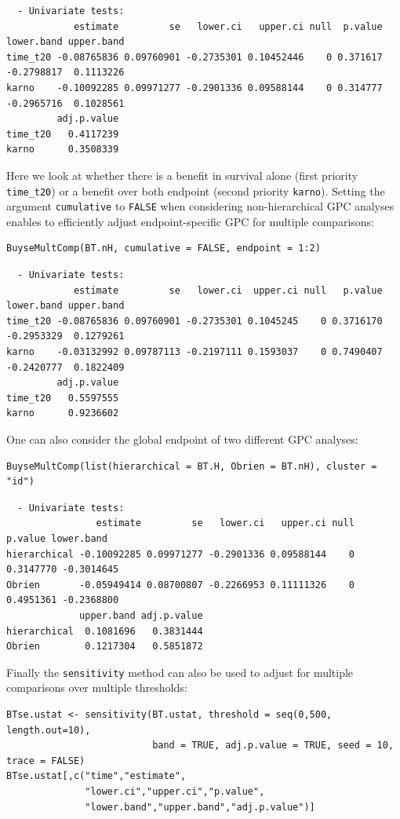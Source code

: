 \documentclass[12pt]{article}
\begin{document}
\begin{verbatim}
  - Univariate tests:
            estimate         se   lower.ci   upper.ci null  p.value lower.band upper.band
time_t20 -0.08765836 0.09760901 -0.2735301 0.10452446    0 0.371617 -0.2798817  0.1113226
karno    -0.10092285 0.09971277 -0.2901336 0.09588144    0 0.314777 -0.2965716  0.1028561
         adj.p.value
time_t20   0.4117239
karno      0.3508339
\end{verbatim}


Here we look at whether there is a benefit in survival alone (first
priority \texttt{time\_t20}) or a benefit over both endpoint (second priority
\texttt{karno}). Setting the argument \texttt{cumulative} to \texttt{FALSE} when
considering non-hierarchical GPC analyses enables to efficiently
adjust endpoint-specific GPC for multiple comparisons:
\lstset{language=r,label= ,caption= ,captionpos=b,numbers=none}
\begin{lstlisting}
BuyseMultComp(BT.nH, cumulative = FALSE, endpoint = 1:2)
\end{lstlisting}

\begin{verbatim}
  - Univariate tests:
            estimate         se   lower.ci  upper.ci null   p.value lower.band upper.band
time_t20 -0.08765836 0.09760901 -0.2735301 0.1045245    0 0.3716170 -0.2953329  0.1279261
karno    -0.03132992 0.09787113 -0.2197111 0.1593037    0 0.7490407 -0.2420777  0.1822409
         adj.p.value
time_t20   0.5597555
karno      0.9236602
\end{verbatim}


One can also consider the global endpoint of two different GPC analyses:
\lstset{language=r,label= ,caption= ,captionpos=b,numbers=none}
\begin{lstlisting}
BuyseMultComp(list(hierarchical = BT.H, Obrien = BT.nH), cluster = "id")
\end{lstlisting}

\begin{verbatim}
  - Univariate tests:
                estimate         se   lower.ci   upper.ci null   p.value lower.band
hierarchical -0.10092285 0.09971277 -0.2901336 0.09588144    0 0.3147770 -0.3014645
Obrien       -0.05949414 0.08700807 -0.2266953 0.11111326    0 0.4951361 -0.2368800
             upper.band adj.p.value
hierarchical  0.1081696   0.3831444
Obrien        0.1217304   0.5851872
\end{verbatim}


Finally the \texttt{sensitivity} method can also be used to adjust for
multiple comparisons over multiple thresholds:
\lstset{language=r,label= ,caption= ,captionpos=b,numbers=none}
\begin{lstlisting}
BTse.ustat <- sensitivity(BT.ustat, threshold = seq(0,500, length.out=10),
                          band = TRUE, adj.p.value = TRUE, seed = 10, trace = FALSE)
BTse.ustat[,c("time","estimate",
              "lower.ci","upper.ci","p.value",
              "lower.band","upper.band","adj.p.value")]
\end{lstlisting}
\end{document}
